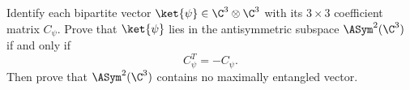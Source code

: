Identify each bipartite vector $\ket{\psi}\in\C^3\otimes\C^3$ with its $3\times3$ coefficient matrix $C_\psi$. Prove that $\ket{\psi}$ lies in the antisymmetric subspace $\ASym^2(\C^3)$ if and only if
$$
C_\psi^T=-C_\psi.
$$
Then prove that $\ASym^2(\C^3)$ contains no maximally entangled vector.
